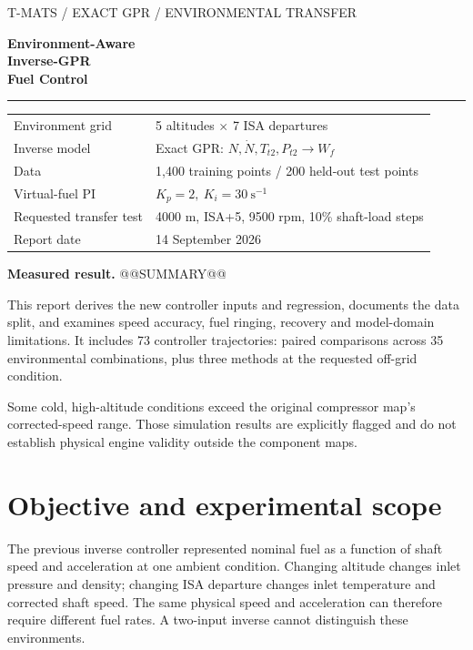 \begin{titlepage}
\color{navy}\sffamily
{\small T-MATS / EXACT GPR / ENVIRONMENTAL TRANSFER}\par\vspace{18mm}
{\fontsize{29}{35}\selectfont\bfseries Environment-Aware\\Inverse-GPR\\Fuel Control\par}
\vspace{9mm}{\Large Altitude and ISA extension, fixed PI gains,\\and disturbance-response comparison\par}
\vspace{10mm}\color{teal}\rule{\linewidth}{1.2pt}\color{navy}\vspace{8mm}
\begin{tabular}{@{}ll}
Environment grid & 5 altitudes $\times$ 7 ISA departures\\[5pt]
Inverse model & Exact GPR: $N,\dot N,T_{t2},P_{t2}\rightarrow W_f$\\[5pt]
Data & 1,400 training points / 200 held-out test points\\[5pt]
Virtual-fuel PI & $K_p=2,\ K_i=30\ \mathrm{s}^{-1}$\\[5pt]
Requested transfer test & 4000 m, ISA+5, 9500 rpm, 10\% shaft-load steps\\[5pt]
Report date & 14 September 2026
\end{tabular}
\par\vspace{10mm}\normalfont\color{ink}
\textbf{Measured result.} @@SUMMARY@@

This report derives the new controller inputs and regression, documents the data split, and examines speed accuracy, fuel ringing, recovery and model-domain limitations. It includes 73 controller trajectories: paired comparisons across 35 environmental combinations, plus three methods at the requested off-grid condition.

\vfill Some cold, high-altitude conditions exceed the original compressor map's corrected-speed range. Those simulation results are explicitly flagged and do not establish physical engine validity outside the component maps.
\end{titlepage}
\tableofcontents\clearpage

\section{Objective and experimental scope}
The previous inverse controller represented nominal fuel as a function of shaft speed and acceleration at one ambient condition. Changing altitude changes inlet pressure and density; changing ISA departure changes inlet temperature and corrected shaft speed. The same physical speed and acceleration can therefore require different fuel rates. A two-input inverse cannot distinguish these environments.

